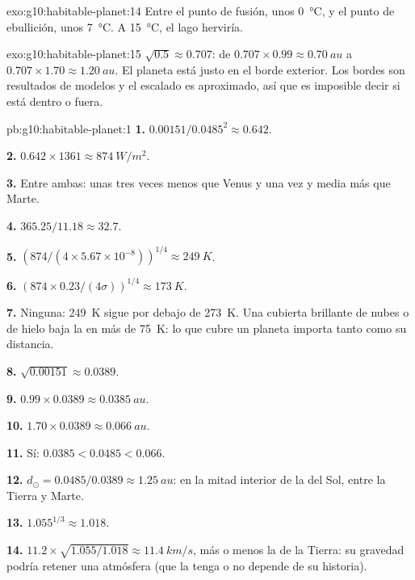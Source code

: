 \begin{solution}{exo:g10:habitable-planet:14}
Entre el punto de fusión, unos \qty{0}{\degreeCelsius}, y el punto de
ebullición, unos \qty{7}{\degreeCelsius}. A \qty{15}{\degreeCelsius}, el
lago herviría.
\end{solution}

\begin{solution}{exo:g10:habitable-planet:15}
$\sqrt{0.5} \approx 0.707$: de $0.707 \times 0.99 \approx \qty{0.70}{au}$
a $0.707 \times 1.70 \approx \qty{1.20}{au}$. El planeta está justo en el
borde exterior. Los bordes son resultados de modelos y el escalado es
aproximado, así que es imposible decir si está dentro o fuera.
\end{solution}

\begin{solution}{pb:g10:habitable-planet:1}
\textbf{1.} $0.00151/0.0485^2 \approx 0.642$.

\textbf{2.} $0.642 \times 1361 \approx \qty{874}{W/m^2}$.

\textbf{3.} Entre ambas: unas tres veces menos que Venus y una vez y media
más que Marte.

\textbf{4.} $365.25/11.18 \approx 32.7$.

\textbf{5.} $(874/(4 \times 5.67\times10^{-8}))^{1/4} \approx \qty{249}{K}$.

\textbf{6.} $(874 \times 0.23/(4\sigma))^{1/4} \approx \qty{173}{K}$.

\textbf{7.} Ninguna: \qty{249}{K} sigue por debajo de \qty{273}{K}. Una
cubierta brillante de nubes o de hielo baja la  en
más de \qty{75}{K}: lo que cubre un planeta importa tanto como su distancia.

\textbf{8.} $\sqrt{0.00151} \approx 0.0389$.

\textbf{9.} $0.99 \times 0.0389 \approx \qty{0.0385}{au}$.

\textbf{10.} $1.70 \times 0.0389 \approx \qty{0.066}{au}$.

\textbf{11.} Sí: $0.0385 < 0.0485 < 0.066$.

\textbf{12.} $d_\odot = 0.0485/0.0389 \approx \qty{1.25}{au}$: en la mitad
interior de la  del Sol, entre la Tierra y Marte.

\textbf{13.} $1.055^{1/3} \approx 1.018$.

\textbf{14.} $11.2 \times \sqrt{1.055/1.018} \approx \qty{11.4}{km/s}$,
más o menos la de la Tierra: su gravedad podría retener una atmósfera (que
la tenga o no depende de su historia).


\end{solution}
